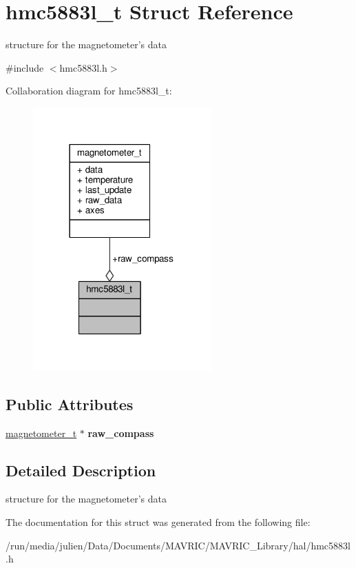 \hypertarget{structhmc5883l__t}{\section{hmc5883l\+\_\+t Struct Reference}
\label{structhmc5883l__t}
}


structure for the magnetometer's data  




{\ttfamily \#include $<$hmc5883l.\+h$>$}



Collaboration diagram for hmc5883l\+\_\+t\+:
\nopagebreak
\begin{figure}[H]
\begin{center}
\leavevmode
\includegraphics[width=194pt]{structhmc5883l__t__coll__graph}
\end{center}
\end{figure}
\subsection*{Public Attributes}
\begin{DoxyCompactItemize}
\item 
\hypertarget{structhmc5883l__t_aac0e697f30f03005b97acb71d1035ed0}{\hyperlink{structmagnetometer__t}{magnetometer\+\_\+t} $\ast$ {\bfseries raw\+\_\+compass}}\label{structhmc5883l__t_aac0e697f30f03005b97acb71d1035ed0}

\end{DoxyCompactItemize}


\subsection{Detailed Description}
structure for the magnetometer's data 

The documentation for this struct was generated from the following file\+:\begin{DoxyCompactItemize}
\item 
/run/media/julien/\+Data/\+Documents/\+M\+A\+V\+R\+I\+C/\+M\+A\+V\+R\+I\+C\+\_\+\+Library/hal/hmc5883l.\+h\end{DoxyCompactItemize}
